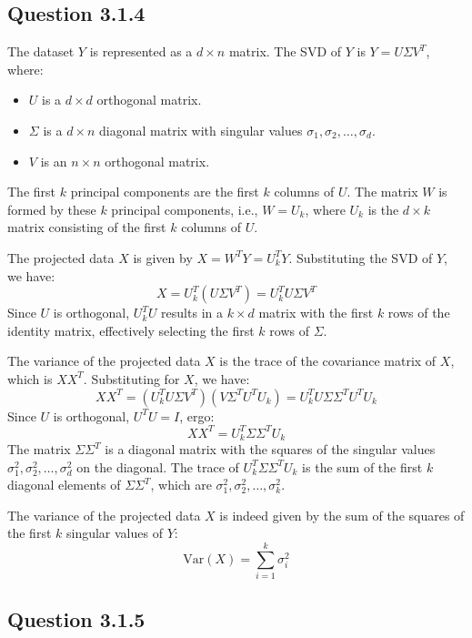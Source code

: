 \documentclass{article}
\begin{document}
\newpage

\subsection{Question 3.1.4}

The dataset \( Y \) is represented as a \( d \times n \) matrix. The SVD of \( Y \) is \( Y = U \Sigma V^T \), where:
\begin{itemize}
    \item \( U \) is a \( d \times d \) orthogonal matrix.
    \item \( \Sigma \) is a \( d \times n \) diagonal matrix with singular values \(\sigma_1, \sigma_2, \ldots, \sigma_d\).
    \item \( V \) is an \( n \times n \) orthogonal matrix.
\end{itemize}

The first \( k \) principal components are the first \( k \) columns of \( U \). The matrix \( W \) is formed by these \( k \) principal components, i.e., \( W = U_k \), where \( U_k \) is the \( d \times k \) matrix consisting of the first \( k \) columns of \( U \).

The projected data \( X \) is given by \( X = W^T Y = U_k^T Y \). Substituting the SVD of \( Y \), we have:
\[
X = U_k^T (U \Sigma V^T) = U_k^T U \Sigma V^T
\]
Since \( U \) is orthogonal, \( U_k^T U \) results in a \( k \times d \) matrix with the first \( k \) rows of the identity matrix, effectively selecting the first \( k \) rows of \( \Sigma \).

The variance of the projected data \( X \) is the trace of the covariance matrix of \( X \), which is \( X X^T \). Substituting for \( X \), we have:
\[
X X^T = (U_k^T U \Sigma V^T)(V \Sigma^T U^T U_k) = U_k^T U \Sigma \Sigma^T U^T U_k
\]
Since \( U \) is orthogonal, \( U^T U = I \), ergo:
\[
X X^T = U_k^T \Sigma \Sigma^T U_k
\]
The matrix \( \Sigma \Sigma^T \) is a diagonal matrix with the squares of the singular values \(\sigma_1^2, \sigma_2^2, \ldots, \sigma_d^2\) on the diagonal. The trace of \( U_k^T \Sigma \Sigma^T U_k \) is the sum of the first \( k \) diagonal elements of \( \Sigma \Sigma^T \), which are \(\sigma_1^2, \sigma_2^2, \ldots, \sigma_k^2\).

The variance of the projected data \( X \) is indeed given by the sum of the squares of the first \( k \) singular values of \( Y \):
\[
\text{Var}(X) = \sum_{i=1}^{k} \sigma_i^2
\]

\subsection{Question 3.1.5}
\end{document}
